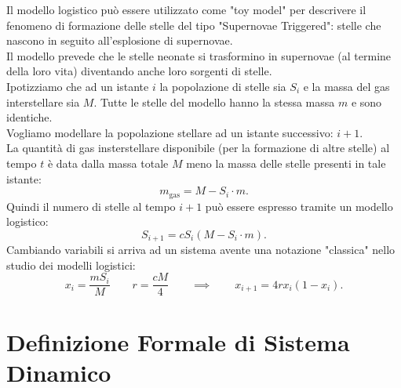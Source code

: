 \begin{exmp}
    Il modello logistico può essere utilizzato come "toy model" per descrivere il fenomeno di formazione delle stelle del tipo "Supernovae Triggered": 
    stelle che nascono in seguito all'esplosione di supernovae. \\
    Il modello prevede che le stelle neonate si trasformino in supernovae (al termine della loro vita) diventando anche loro sorgenti di stelle.
    \\
    Ipotizziamo che ad un istante $i$ la popolazione di stelle sia $S_i$ e la massa del gas interstellare sia $M$. Tutte le stelle del modello hanno la stessa massa $m$ e sono identiche. \\
    Vogliamo modellare la popolazione stellare ad un istante successivo: $i+1$.\\
    La quantità di gas insterstellare disponibile (per la formazione di altre stelle) al tempo $t$ è data dalla massa totale $M$ meno la massa delle stelle presenti in tale istante:
    \[
        m_{\text{gas}} = M-S_i\cdot m
    .\] 
    Quindi il numero di stelle al tempo $i+1$ può essere espresso tramite un modello logistico:
    \[
	S_{i+1} = cS_i (M-S_i\cdot m)
    .\] 
    Cambiando variabili si arriva ad un sistema avente una notazione "classica" nello studio dei modelli logistici:
    \[
	x_i = \frac{mS_i}{M} \qquad r = \frac{cM}{4} \qquad \implies  \qquad x_{i+1} = 4rx_i(1-x_i)
    .\] 
\end{exmp}
\noindent
\section{Definizione Formale di Sistema Dinamico}%
\label{sub:Definizione Formale di Sistema Dinamico}
